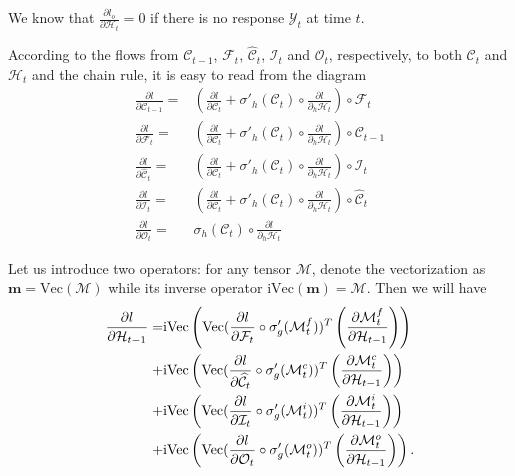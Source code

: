 \documentclass[journal]{IEEEtran}
\begin{document}
We know that $\frac{\partial l_o}{\partial \mathcal{H}_t} = 0$ if there is no response $\mathcal{Y}_t$ at time $t$.



   
According to the flows from $\mathcal{C}_{t-1}$, $\mathcal{F}_t$, $\widehat{\mathcal{C}}_{t}$, $\mathcal{I}_t$ and $\mathcal{O}_t$, respectively, to both $\mathcal{C}_t$ and $\mathcal{H}_t$ and the chain rule, it is easy to read from the diagram
\begin{align}
\frac{\partial l}{\partial \mathcal{C}_{t-1}} = & \left(\frac{\partial l}{\partial \mathcal{C}_{t}} + \sigma '_h (\mathcal{C}_t) \circ \frac{\partial l}{\partial_h\mathcal{H}_t} \right)\circ \mathcal{F}_t \label{Eq24}\\
\frac{\partial l}{\partial \mathcal{F}_{t}} = & \left(\frac{\partial l}{\partial \mathcal{C}_{t}} + \sigma '_h (\mathcal{C}_t) \circ \frac{\partial l}{\partial_h\mathcal{H}_t}\right) \circ \mathcal{C}_{t-1} \label{Eq25}\\
\frac{\partial l}{\partial \widehat{\mathcal{C}}_{t}} = & \left(\frac{\partial l}{\partial \mathcal{C}_{t}} + \sigma '_h (\mathcal{C}_t) \circ \frac{\partial l}{\partial_h\mathcal{H}_t} \right)\circ \mathcal{I}_{t} \label{Eq26}\\
\frac{\partial l}{\partial \mathcal{I}_{t}} = & \left(\frac{\partial l}{\partial \mathcal{C}_{t}} + \sigma '_h (\mathcal{C}_t) \circ \frac{\partial l}{\partial_h\mathcal{H}_t} \right) \circ \widehat{\mathcal{C}}_{t}\label{Eq27}\\
\frac{\partial l}{\partial \mathcal{O}_{t}} = &   \sigma_h (\mathcal{C}_t) \circ \frac{\partial l}{\partial_h\mathcal{H}_t} \label{Eq28}
\end{align}

Let us introduce two operators: for any tensor $\mathcal{M}$, denote the vectorization as $\mathbf m = \text{Vec}(\mathcal{M})$ while its inverse operator $\text{iVec}(\mathbf m) = \mathcal{M}$. Then we will have
\begin{align}
\frac{\partial l}{\partial \mathcal{H}_{t-1}} = & \text{iVec}\left( \text{Vec}(\frac{\partial l}{\partial \mathcal{F}_{t}} \circ \sigma '_g(\mathcal{M}^f_t))^T \left(\frac{\partial \mathcal{M}^{f}_t}{\partial \mathcal{H}_{t-1}}\right)\right) \notag\\
+& \text{iVec}\left( \text{Vec}(\frac{\partial l}{\partial \widehat{\mathcal{C}}_{t}} \circ \sigma '_g(\mathcal{M}^c_t))^T \left(\frac{\partial \mathcal{M}^{c}_t}{\partial \mathcal{H}_{t-1}}\right)\right) \notag\\
+&\text{iVec}\left( \text{Vec}(\frac{\partial l}{\partial \mathcal{I}_{t}} \circ \sigma '_g(\mathcal{M}^i_t))^T \left(\frac{\partial \mathcal{M}^{i}_t}{\partial \mathcal{H}_{t-1}}\right)\right) \notag\\
+&\text{iVec}\left( \text{Vec}(\frac{\partial l}{\partial \mathcal{O}_{t}} \circ \sigma '_g(\mathcal{M}^o_t))^T \left(\frac{\partial \mathcal{M}^{o}_t}{\partial \mathcal{H}_{t-1}}\right)\right). \label{Eq29}
\end{align}
\end{document}
